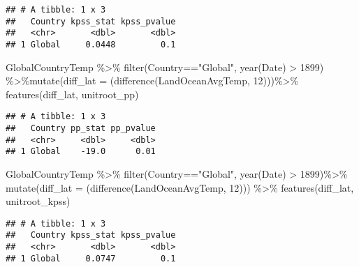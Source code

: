 \documentclass[
]{article}
\newenvironment{Shaded}{\begin{snugshade}}{\end{snugshade}}
\newcommand{\AttributeTok}[1]{\textcolor[rgb]{0.77,0.63,0.00}{#1}}
\newcommand{\DecValTok}[1]{\textcolor[rgb]{0.00,0.00,0.81}{#1}}
\newcommand{\FunctionTok}[1]{\textcolor[rgb]{0.00,0.00,0.00}{#1}}
\newcommand{\NormalTok}[1]{#1}
\newcommand{\SpecialCharTok}[1]{\textcolor[rgb]{0.00,0.00,0.00}{#1}}
\newcommand{\StringTok}[1]{\textcolor[rgb]{0.31,0.60,0.02}{#1}}
\begin{document}
\begin{verbatim}
## # A tibble: 1 x 3
##   Country kpss_stat kpss_pvalue
##   <chr>       <dbl>       <dbl>
## 1 Global     0.0448         0.1
\end{verbatim}

\begin{Shaded}
\begin{Highlighting}[]
\NormalTok{GlobalCountryTemp }\SpecialCharTok{\%\textgreater{}\%} \FunctionTok{filter}\NormalTok{(Country}\SpecialCharTok{==}\StringTok{"Global"}\NormalTok{,  }\FunctionTok{year}\NormalTok{(Date) }\SpecialCharTok{\textgreater{}} \DecValTok{1899}\NormalTok{)  }\SpecialCharTok{\%\textgreater{}\%}\FunctionTok{mutate}\NormalTok{(}\AttributeTok{diff\_lat =}\NormalTok{ (}\FunctionTok{difference}\NormalTok{(LandOceanAvgTemp, }\DecValTok{12}\NormalTok{)))}\SpecialCharTok{\%\textgreater{}\%}
  \FunctionTok{features}\NormalTok{(diff\_lat, unitroot\_pp)}
\end{Highlighting}
\end{Shaded}

\begin{verbatim}
## # A tibble: 1 x 3
##   Country pp_stat pp_pvalue
##   <chr>     <dbl>     <dbl>
## 1 Global    -19.0      0.01
\end{verbatim}

\begin{Shaded}
\begin{Highlighting}[]
\NormalTok{GlobalCountryTemp }\SpecialCharTok{\%\textgreater{}\%} \FunctionTok{filter}\NormalTok{(Country}\SpecialCharTok{==}\StringTok{"Global"}\NormalTok{,  }\FunctionTok{year}\NormalTok{(Date) }\SpecialCharTok{\textgreater{}} \DecValTok{1899}\NormalTok{)}\SpecialCharTok{\%\textgreater{}\%} \FunctionTok{mutate}\NormalTok{(}\AttributeTok{diff\_lat =}\NormalTok{ (}\FunctionTok{difference}\NormalTok{(LandOceanAvgTemp, }\DecValTok{12}\NormalTok{))) }\SpecialCharTok{\%\textgreater{}\%}
  \FunctionTok{features}\NormalTok{(diff\_lat, unitroot\_kpss)}
\end{Highlighting}
\end{Shaded}

\begin{verbatim}
## # A tibble: 1 x 3
##   Country kpss_stat kpss_pvalue
##   <chr>       <dbl>       <dbl>
## 1 Global     0.0747         0.1
\end{verbatim}
\end{document}
